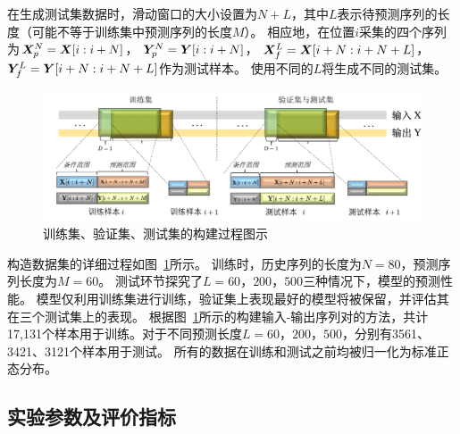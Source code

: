 在生成测试集数据时，滑动窗口的大小设置为$N+L$，其中$L$表示待预测序列的长度（可能不等于训练集中预测序列的长度$M$）。
相应地，在位置$i$采集的四个序列为$\boldsymbol X _p^N =\boldsymbol X[i:i+N]$， $\boldsymbol Y _p^N =\boldsymbol Y[i:i+N]$， $\boldsymbol X _f^L=\boldsymbol X[i+N:i+N+L]$， $\boldsymbol Y _f^L=\boldsymbol Y[i+N:i+N+L]$作为测试样本。
使用不同的$L$将生成不同的测试集。

\begin{figure}[t]
    \centering
    \includegraphics[width=\linewidth]{figures/chapter3/dataset.pdf}
    \caption{
    训练集、验证集、测试集的构建过程图示
    }
    \label{fig:dataset}
\end{figure}


构造数据集的详细过程如图~\ref{fig:dataset}所示。
训练时，历史序列的长度为$N=80$，预测序列长度为$M=60$。
测试环节探究了$L=60\text{，}200\text{，} 500$三种情况下，模型的预测性能。
模型仅利用训练集进行训练，验证集上表现最好的模型将被保留，并评估其在三个测试集上的表现。
根据图~\ref{fig:dataset}所示的构建输入-输出序列对的方法，共计17,131个样本用于训练。对于不同预测长度$L=60\text{，}200\text{，}500$，分别有3561、3421、3121个样本用于测试。
所有的数据在训练和测试之前均被归一化为标准正态分布。

\subsection{实验参数及评价指标}

